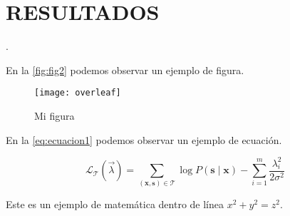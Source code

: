 \chapter{RESULTADOS}

\lipsum[1-1]\autocite{texbook,latex:companion}.

En la \vref{fig:fig2} podemos observar un ejemplo de figura.

\begin{figure}[H]
	\centering
	\texttt{[image: overleaf]}
	\caption{Mi figura}\label{fig:fig2}
\end{figure}

En la \vref{eq:ecuacion1} podemos observar un ejemplo de ecuación.

\begin{eq}[H]
	\caption{Mi ecuación}\label{eq:ecuacion1}
	\[
		\mathcal L_{\mathcal T}(\vec{\lambda})
		= \sum_{(\mathbf{x},\mathbf{s})\in \mathcal T}
		\log P(\mathbf{s}\mid\mathbf{x}) - \sum_{i=1}^m
		\frac{\lambda_i^2}{2\sigma^2}
	\]
\end{eq}



Este es un ejemplo de matemática dentro de línea \(x^2 + y^2 = z^2\).

